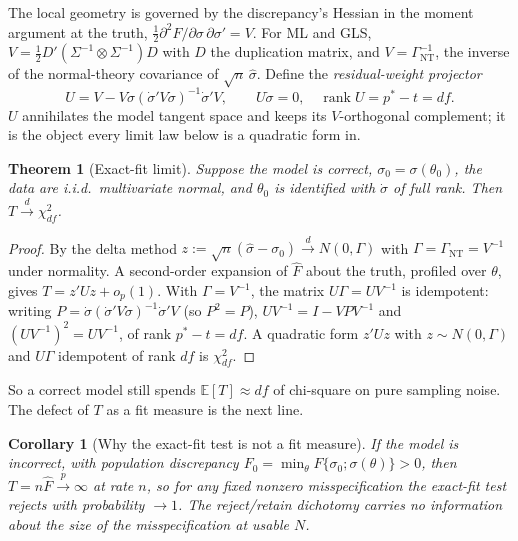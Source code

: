 \documentclass[11pt]{article}
\newcommand{\E}{\mathbb{E}}
\newcommand{\rank}{\operatorname{rank}}
\newcommand{\dto}{\xrightarrow{d}}
\newcommand{\pto}{\xrightarrow{p}}
\theoremstyle{plain}
\newtheorem{theorem}{Theorem}
\newtheorem{corollary}{Corollary}
\theoremstyle{remark}
\begin{document}
The local geometry is governed by the discrepancy's Hessian in the moment
argument at the truth, $\tfrac12\partial^2F/\partial\sigma\,\partial\sigma'=V$.
For ML and GLS, $V=\tfrac12 D'(\Sigma^{-1}\otimes\Sigma^{-1})D$ with $D$ the
duplication matrix, and $V=\Gamma_{\mathrm{NT}}^{-1}$, the inverse of the
normal-theory covariance of $\sqrt n\,\hat\sigma$. Define the
\emph{residual-weight projector}
\begin{equation}\label{eq:U}
  U = V - V\dot\sigma(\dot\sigma'V\dot\sigma)^{-1}\dot\sigma'V,
  \qquad U\dot\sigma = 0,\quad \rank U = p^\ast-t = df.
\end{equation}
$U$ annihilates the model tangent space and keeps its $V$-orthogonal complement;
it is the object every limit law below is a quadratic form in.

\begin{theorem}[Exact-fit limit]\label{thm:exact}
Suppose the model is correct, $\sigma_0=\sigma(\theta_0)$, the data are i.i.d.\
multivariate normal, and $\theta_0$ is identified with $\dot\sigma$ of full rank.
Then $T\dto\chi^2_{df}$.
\end{theorem}

\begin{proof}
By the delta method $z:=\sqrt n(\hat\sigma-\sigma_0)\dto N(0,\Gamma)$ with
$\Gamma=\Gamma_{\mathrm{NT}}=V^{-1}$ under normality. A second-order expansion of
$\hat F$ about the truth, profiled over $\theta$, gives $T=z'Uz+o_p(1)$. With
$\Gamma=V^{-1}$, the matrix $U\Gamma=UV^{-1}$ is idempotent: writing
$P=\dot\sigma(\dot\sigma'V\dot\sigma)^{-1}\dot\sigma'V$ (so $P^2=P$),
$UV^{-1}=I-VPV^{-1}$ and $(UV^{-1})^2=UV^{-1}$, of rank $p^\ast-t=df$. A quadratic
form $z'Uz$ with $z\sim N(0,\Gamma)$ and $U\Gamma$ idempotent of rank $df$ is
$\chi^2_{df}$.
\end{proof}

So a correct model still spends $\E[T]\approx df$ of chi-square on pure sampling
noise. The defect of $T$ as a fit measure is the next line.

\begin{corollary}[Why the exact-fit test is not a fit measure]\label{cor:diverge}
If the model is incorrect, with population discrepancy
$F_0=\min_\theta F\{\sigma_0;\sigma(\theta)\}>0$, then $T=n\hat F\pto\infty$ at
rate $n$, so for any fixed nonzero misspecification the exact-fit test rejects
with probability $\to1$. The reject/retain dichotomy carries no information
about the \emph{size} of the misspecification at usable $N$.
\end{corollary}
\end{document}
